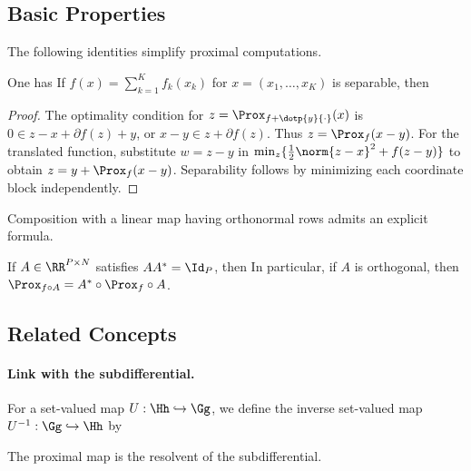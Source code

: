 \subsection{Basic Properties}

The following identities simplify proximal computations.

\begin{prop}
One has
If $f(x)=\sum_{k=1}^K f_k(x_k)$ for $x=(x_1,\ldots,x_K)$ is separable, then
\end{prop}
\begin{proof}
The optimality condition for $z=\Prox_{f+\dotp{y}{\cdot}}(x)$ is $0\in z-x+\partial f(z)+y$, or $x-y\in z+\partial f(z)$. Thus $z=\Prox_f(x-y)$. For the translated function, substitute $w=z-y$ in
$\min_z\{\frac12\norm{z-x}^2+f(z-y)\}$ to obtain $z=y+\Prox_f(x-y)$. Separability follows by minimizing each coordinate block independently.
\end{proof}

Composition with a linear map having orthonormal rows admits an explicit formula.

\begin{prop}\label{prop-prox-tightframe}
	If $A \in \RR^{P \times N}$ satisfies $AA^*=\Id_P$, then
	In particular, if $A$ is orthogonal, then $\Prox_{f \circ A} = A^* \circ \Prox_{f} \circ A$.
\end{prop}


\subsection{Related Concepts}

\paragraph{Link with the subdifferential.}

For a set-valued map $U : \Hh \hookrightarrow \Gg$, we define the inverse set-valued map $U^{-1} : \Gg \hookrightarrow \Hh$ by 

The proximal map is the resolvent of the subdifferential.


